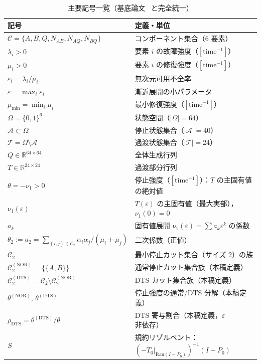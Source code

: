 \documentclass[12pt,a4paper]{article}
\theoremstyle{plain}
\theoremstyle{definition}
\theoremstyle{remark}
\newcommand{\calA}{\mathcal{A}}        %
\newcommand{\calT}{\mathcal{T}}        %
\newcommand{\calC}{\mathcal{C}}        %
\newcommand{\eps}{\varepsilon}         %
\newcommand{\RedRes}{S}                %
\newcommand{\Proj}{P}                  %
\newcommand{\calCtwo}{\mathcal{C}_2}   %
\newcommand{\calCNOR}{\calCtwo^{(\mathrm{NOR})}}
\newcommand{\calCDTS}{\calCtwo^{(\mathrm{DTS})}}
\newcommand{\thetaNOR}{\theta^{(\mathrm{NOR})}}
\newcommand{\thetaDTS}{\theta^{(\mathrm{DTS})}}
\newcommand{\rhoDTS}{\rho_{\mathrm{DTS}}}
\begin{document}
\begin{table}[H]
  \centering
  \caption{主要記号一覧（基底論文~\cite{habase:v7} と完全統一）}
  \label{tab:notation}
  \begin{tabular}{p{6.5cm}p{8cm}}
    \toprule
    記号 & 定義・単位 \\
    \midrule
    $\calC = \{A,B,Q,N_{AB},N_{AQ},N_{BQ}\}$ & コンポーネント集合（6 要素） \\
    $\lambda_i > 0$ & 要素 $i$ の故障強度（$[\mathrm{time}^{-1}]$） \\
    $\mu_i > 0$ & 要素 $i$ の修復強度（$[\mathrm{time}^{-1}]$） \\
    $\eps_i = \lambda_i/\mu_i$ & 無次元可用不全率 \\
    $\eps = \max_i \eps_i$ & 漸近展開の小パラメータ \\
    $\mu_{\min} = \min_i \mu_i$ & 最小修復強度（$[\mathrm{time}^{-1}]$） \\
    $\Omega = \{0,1\}^6$ & 状態空間（$|\Omega|=64$） \\
    $\calA \subset \Omega$ & 停止状態集合（$|\calA|=40$） \\
    $\calT = \Omega \setminus \calA$ & 過渡状態集合（$|\calT|=24$） \\
    $Q \in \mathbb{R}^{64\times 64}$ & 全体生成行列 \\
    $T \in \mathbb{R}^{24\times 24}$ & 過渡部分行列 \\
    $\theta = -\nu_1 > 0$ & 停止強度（$[\mathrm{time}^{-1}]$）：$T$ の主固有値の絶対値 \\
    $\nu_1(\eps)$ & $T(\eps)$ の主固有値（最大実部），$\nu_1(0)=0$ \\
    $a_k$ & 固有値展開 $\nu_1(\eps)=\sum a_k\eps^k$ の係数 \\
    $\theta_2 := a_2 = \sum_{(i,j)\in\calCtwo}\alpha_i\alpha_j/(\mu_i+\mu_j)$ & 二次係数（正値） \\
    $\calCtwo$ & 最小停止カット集合（サイズ 2）の族 \\
    $\calCNOR = \{\{A,B\}\}$ & 通常停止カット集合族（本稿定義） \\
    $\calCDTS = \calCtwo \setminus \calCNOR$ & DTS カット集合族（本稿定義） \\
    $\thetaNOR,\,\thetaDTS$ & 停止強度の通常/DTS 分解（本稿定義） \\
    $\rhoDTS = \thetaDTS/\theta$ & DTS 寄与割合（本稿定義，$\eps$ 非依存） \\
    $\RedRes$ & 規約リゾルベント：$(-T_0|_{\mathrm{Ran}(I-\Proj_0)})^{-1}(I-\Proj_0)$ \\

\end{tabular}
\end{table}
\end{document}
